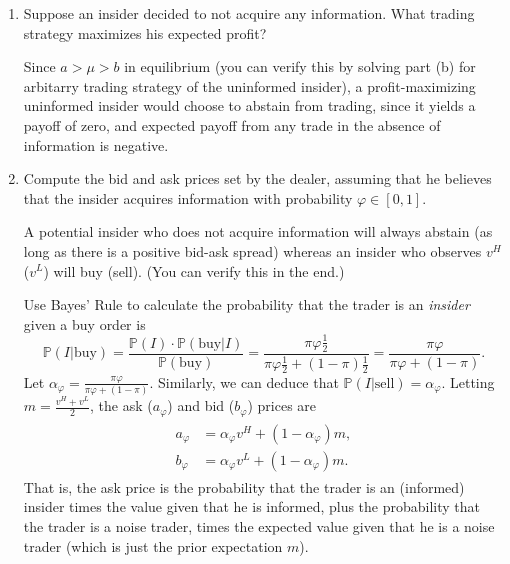 \documentclass[11pt
, answers
]{exam}
\begin{document}
\begin{enumerate} [label=(\alph*). ]

\item Suppose an insider decided to not acquire any information. What trading strategy maximizes his expected profit?

\begin{solution}
	Since $a > \mu > b$ in equilibrium (you can verify this by solving part (b) for arbitarry trading strategy of the uninformed insider), a profit-maximizing uninformed insider would choose to abstain from trading, since it yields a payoff of zero, and expected payoff from any trade in the absence of information is negative.
\end{solution}


\item Compute the bid and ask prices set by the dealer, assuming that he believes that the insider acquires information with probability $\varphi \in [0,1]$.

\begin{solution}
	A potential insider who does not acquire information will always abstain (as long as there is a positive bid-ask spread) whereas an insider who observes $v^H$ ($v^L$) will buy (sell). (You can verify this in the end.)
	
	Use Bayes' Rule to calculate the probability that the trader is an \textit{insider} given a buy order is
	\[
	\mathbb{P}(I|\text{buy}) = \frac{\mathbb{P}(I) \cdot \mathbb{P}(\text{buy}|I)}{\mathbb{P}(\text{buy})} =\frac{\pi \varphi \frac{1}{2}}{\pi \varphi \frac{1}{2} + (1-\pi)\frac{1}{2}} = \frac{\pi \varphi }{\pi \varphi  + (1-\pi)}.
	\]
	Let $\alpha_\varphi = \frac{\pi \varphi }{\pi \varphi  + (1-\pi)}$. Similarly, we can deduce that $\mathbb{P}(I|\text{sell})=\alpha_\varphi$. Letting $m=\frac{v^H+v^L}{2}$, the ask ($a_\varphi$) and bid ($b_\varphi$) prices are
	\begin{gather}
		\begin{aligned}
		a_\varphi & = \alpha_\varphi v^H+(1-\alpha_\varphi) m, \\
		b_\varphi & = \alpha_\varphi v^L+(1-\alpha_\varphi) m.
		\end{aligned}
		\label{eq:bidask}
	\end{gather}
	That is, the ask price is the probability that the trader is an (informed) insider times the value given that he is informed, plus the probability that the trader is a noise trader, times the expected value  given that he is a noise trader (which is just the prior expectation $m$).
\end{solution}



\end{enumerate}
\end{document}
